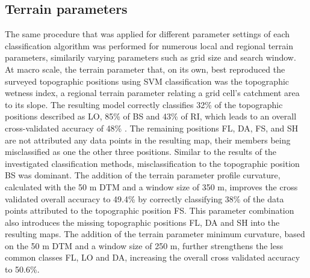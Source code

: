 \documentclass[preprint,12pt,authoryear]{elsarticle}
\begin{document}
\subsection{Terrain parameters}
The same procedure that was applied for different parameter settings of each classification algorithm was performed for  numerous local and regional terrain parameters, similarily varying parameters such as grid size and search window. At macro scale, the terrain parameter that, on its own, best reproduced the surveyed topographic positions using SVM classification was the topographic wetness index, a regional terrain parameter relating a grid cell's catchment area to its slope. The resulting model correctly classifies 32\% of the topographic positions described as LO, 85\% of BS and 43\% of RI, which leads to an overall cross-validated accuracy of 48\% . The remaining positions FL, DA, FS, and SH are not attributed any data points in the resulting map, their members being misclassified as one the other three positions. Similar to the results of the investigated classification methods, misclassification to the topographic position BS was dominant. The addition of the terrain parameter profile curvature, calculated with the 50 m DTM and a window size of 350 m, improves the cross validated overall accuracy to 49.4\% by correctly classifying 38\% of the data points attributed to the topographic position FS. This parameter combination also introduces the missing topographic positions FL, DA and SH into the resulting maps. The addition of the terrain parameter minimum curvature, based on the 50 m DTM and a window size of 250 m, further strengthens the less common classes FL, LO and DA, increasing the overall cross validated accuracy to 50.6\%.
\end{document}

